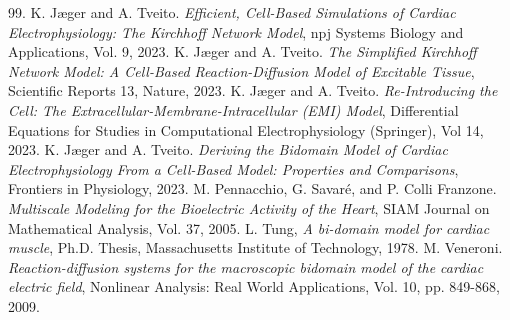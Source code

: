 \documentclass[a4paper,11pt]{article}
\theoremstyle{definition}
\numberwithin{equation}{section}
\begin{document}
\begin{thebibliography}{99.}
	 K. J\ae ger and A. Tveito. \textit{Efficient, Cell-Based Simulations of Cardiac Electrophysiology: The Kirchhoff Network Model}, npj Systems Biology and Applications, Vol. 9, 2023.
	 K. J\ae ger and A. Tveito. \textit{The Simplified Kirchhoff Network Model: A Cell-Based Reaction-Diffusion Model of Excitable Tissue}, Scientific Reports 13, Nature, 2023.
	 K. J\ae ger and A. Tveito. \textit{Re-Introducing the Cell: The Extracellular-Membrane-Intracellular (EMI) Model}, Differential Equations for Studies in Computational Electrophysiology (Springer), Vol 14, 2023.
	 K. J\ae ger and A. Tveito. \textit{Deriving the Bidomain Model of Cardiac Electrophysiology From a Cell-Based Model: Properties and Comparisons}, Frontiers in Physiology, 2023.
	 M. Pennacchio, G. Savar\'e, and P. Colli Franzone. \textit{Multiscale Modeling for the Bioelectric Activity of the Heart}, SIAM Journal on Mathematical Analysis, Vol. 37, 2005.
	 L. Tung, \textit{A bi-domain model for cardiac muscle}, Ph.D. Thesis, Massachusetts Institute of Technology, 1978.
     M. Veneroni. \textit{Reaction-diffusion systems for the macroscopic bidomain model of the cardiac electric field}, Nonlinear Analysis: Real World Applications, Vol. 10, pp. 849-868, 2009.
\end{thebibliography}
\end{document}
